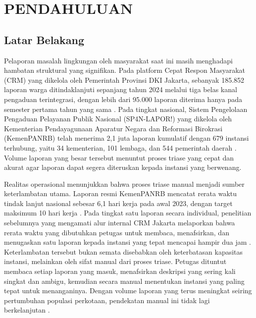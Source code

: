 \chapter{PENDAHULUAN}
\label{ch:pendahuluan}

\section{Latar Belakang}

Pelaporan masalah lingkungan oleh masyarakat saat ini masih menghadapi hambatan struktural yang signifikan. Pada platform Cepat Respon Masyarakat (CRM) yang dikelola oleh Pemerintah Provinsi DKI Jakarta, sebanyak 185.852 laporan warga ditindaklanjuti sepanjang tahun 2024 melalui tiga belas kanal pengaduan terintegrasi, dengan lebih dari 95.000 laporan diterima hanya pada semester pertama tahun yang sama \citep{jakartaSmartCityKaleidoskop2024,jakartaSmartCityCRMSemesterI2024}. Pada tingkat nasional, Sistem Pengelolaan Pengaduan Pelayanan Publik Nasional (SP4N-LAPOR!) yang dikelola oleh Kementerian Pendayagunaan Aparatur Negara dan Reformasi Birokrasi (KemenPANRB) telah menerima 2,1 juta laporan kumulatif dengan 679 instansi terhubung, yaitu 34 kementerian, 101 lembaga, dan 544 pemerintah daerah \citep{menpanrbSP4N21Juta2024}. Volume laporan yang besar tersebut menuntut proses triase yang cepat dan akurat agar laporan dapat segera diteruskan kepada instansi yang berwenang.

Realitas operasional menunjukkan bahwa proses triase manual menjadi sumber keterlambatan utama. Laporan resmi KemenPANRB mencatat rerata waktu tindak lanjut nasional sebesar 6,1 hari kerja pada awal 2023, dengan target maksimum 10 hari kerja \citep{menpanrbSP4NLapor2023}. Pada tingkat satu laporan secara individual, penelitian sebelumnya yang mengamati alur internal CRM Jakarta melaporkan bahwa rerata waktu yang dibutuhkan petugas untuk membaca, menafsirkan, dan menugaskan satu laporan kepada instansi yang tepat mencapai hampir dua jam \citep{hanifPenugasanOtomatis2024}. Keterlambatan tersebut bukan semata disebabkan oleh keterbatasan kapasitas instansi, melainkan oleh sifat manual dari proses triase. Petugas dituntut membaca setiap laporan yang masuk, menafsirkan deskripsi yang sering kali singkat dan ambigu, kemudian secara manual menentukan instansi yang paling tepat untuk menanganinya. Dengan volume laporan yang terus meningkat seiring pertumbuhan populasi perkotaan, pendekatan manual ini tidak lagi berkelanjutan \citep{siretPublicComplainingBlessing2022}.

